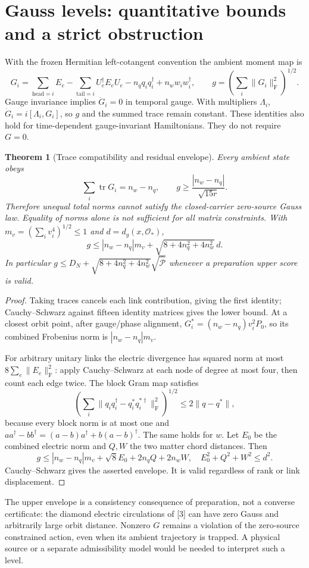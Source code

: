 \documentclass[11pt,a4paper]{article}
\newtheorem{theorem}{Theorem}\newtheorem{lemma}[theorem]{Lemma}\newtheorem{corollary}[theorem]{Corollary}
\newcommand{\tr}{\operatorname{tr}}\newcommand{\diag}{\operatorname{diag}}\newcommand{\Rea}{\operatorname{Re}}\newcommand{\Om}{\mathcal O_*}\newcommand{\F}{\mathrm F}
\begin{document}
\section{Gauss levels: quantitative bounds and a strict obstruction}
With the frozen Hermitian left-cotangent convention the ambient moment map is
\[
G_i=\sum_{\mathrm{head}=i}E_e-\sum_{\mathrm{tail}=i}U_e^\dagger E_eU_e
-n_q q_iq_i^\dagger+n_w w_iw_i^\dagger,\qquad
 g=\left(\sum_i\|G_i\|_\F^2\right)^{1/2}.
\]
Gauge invariance implies $\dot G_i=0$ in temporal gauge. With multipliers $\Lambda_i$, $\dot G_i=i[\Lambda_i,G_i]$, so $g$ and the summed trace remain constant. These identities also hold for time-dependent gauge-invariant Hamiltonians. They do not require $G=0$.
\begin{theorem}[Trace compatibility and residual envelope]\label{th:gauss}
Every ambient state obeys
\[
\sum_i\tr G_i=n_w-n_q,\qquad
\boxed{g\ge\frac{|n_w-n_q|}{\sqrt{15r}}.}
\]
Therefore unequal total norms cannot satisfy the closed-carrier zero-source Gauss law. Equality of norms alone is not sufficient for all matrix constraints. With $m_v=(\sum_i v_i^4)^{1/2}\le1$ and $d=d_g(x,\Om)$,
\[
\boxed{g\le |n_w-n_q|m_v+
\sqrt{8+4n_q^2+4n_w^2}\,d.}
\]
In particular $g\le D_N+\sqrt{8+4n_q^2+4n_w^2}\sqrt{\widehat{\mathcal P}}$ whenever a preparation upper score is valid.
\end{theorem}
\begin{proof}
Taking traces cancels each link contribution, giving the first identity; Cauchy--Schwarz against fifteen identity matrices gives the lower bound. At a closest orbit point, after gauge/phase alignment, $G_i^*=(n_w-n_q)v_i^2P_0$, so its combined Frobenius norm is $|n_w-n_q|m_v$.

For arbitrary unitary links the electric divergence has squared norm at most $8\sum_e\|E_e\|_\F^2$: apply Cauchy--Schwarz at each node of degree at most four, then count each edge twice. The block Gram map satisfies
\[
\left(\sum_i\|q_iq_i^\dagger-q_i^*q_i^{*\dagger}\|_\F^2\right)^{1/2}
\le2\|q-q^*\|,
\]
because every block norm is at most one and $aa^\dagger-bb^\dagger=(a-b)a^\dagger+b(a-b)^\dagger$. The same holds for $w$. Let $E_0$ be the combined electric norm and $Q,W$ the two matter chord distances. Then
\[
g\le |n_w-n_q|m_v+\sqrt8E_0+2n_qQ+2n_wW,
\quad E_0^2+Q^2+W^2\le d^2.
\]
Cauchy--Schwarz gives the asserted envelope. It is valid regardless of rank or link displacement.
\end{proof}
The upper envelope is a consistency consequence of preparation, not a converse certificate: the diamond electric circulations of [3] can have zero Gauss and arbitrarily large orbit distance. Nonzero $G$ remains a violation of the zero-source constrained action, even when its ambient trajectory is trapped. A physical source or a separate admissibility model would be needed to interpret such a level.
\newpage
\end{document}
